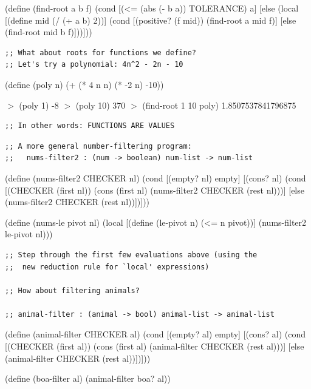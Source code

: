 \documentclass{article}
\begin{document}
\begin{schemedisplay}
(define (find-root a b f)
  (cond
    [(<= (abs (- b a)) TOLERANCE) a]
    [else
     (local [(define mid (/ (+ a b) 2))]
       (cond
         [(positive? (f mid))
          (find-root a mid f)]
         [else
          (find-root mid b f)]))]))
\end{schemedisplay}

\begin{verbatim}
;; What about roots for functions we define?
;; Let's try a polynomial: 4n^2 - 2n - 10
\end{verbatim}

\begin{schemedisplay}
(define (poly n)
  (+ (* 4 n n)
     (* -2 n)
     -10))

$>$ (poly 1)
-8
$>$ (poly 10)
370
$>$ (find-root 1 10 poly)
1.8507537841796875
\end{schemedisplay}

\begin{verbatim}
;; In other words: FUNCTIONS ARE VALUES
\end{verbatim}

\newpage

\begin{verbatim}
;; A more general number-filtering program:
;;   nums-filter2 : (num -> boolean) num-list -> num-list
\end{verbatim}

\begin{schemedisplay}
(define (nums-filter2 CHECKER nl)
  (cond
    [(empty? nl) empty]
    [(cons? nl)
     (cond
       [(CHECKER (first nl))
        (cons (first nl) (nums-filter2 CHECKER (rest nl)))]
       [else
        (nums-filter2 CHECKER (rest nl))])]))

(define (nums-le pivot nl)
  (local [(define (le-pivot n)
            (<= n pivot))]
    (nums-filter2 le-pivot nl)))
\end{schemedisplay}

\begin{verbatim}
;; Step through the first few evaluations above (using the
;;  new reduction rule for `local' expressions)

;; How about filtering animals?

;; animal-filter : (animal -> bool) animal-list -> animal-list
\end{verbatim}

\begin{schemedisplay}
(define (animal-filter CHECKER al)
  (cond
    [(empty? al) empty]
    [(cons? al)
     (cond
       [(CHECKER (first al))
        (cons (first al) (animal-filter CHECKER (rest al)))]
       [else
        (animal-filter CHECKER (rest al))])]))

(define (boa-filter al)
  (animal-filter boa? al))
\end{schemedisplay}
\end{document}
